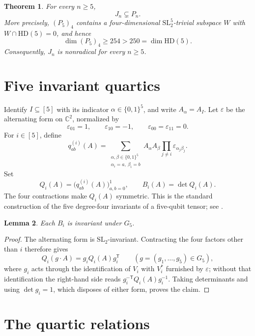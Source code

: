 \documentclass[11pt]{amsart}
\newtheorem{theorem}{Theorem}
\newtheorem{lemma}[theorem]{Lemma}
\theoremstyle{remark}
\newcommand{\C}{\mathbb C}
\newcommand{\HD}{\mathrm{HD}}
\begin{document}
\begin{theorem}\label{thm:main}
For every \(n\geq5\),
\[
  J_n\subsetneq P_n.
\]
More precisely, \((P_5)_4\) contains a four-dimensional
\(\mathrm{SL}_2^5\)-trivial subspace \(W\) with \(W\cap\HD(5)=0\), and hence
\[
  \dim(P_5)_4\geq254>250=\dim\HD(5).
\]
Consequently, \(J_n\) is nonradical for every \(n\geq5\).
\end{theorem}

\section{Five invariant quartics}

Identify \(I\subseteq[5]\) with its indicator
\(\alpha\in\{0,1\}^5\), and write \(A_\alpha=A_I\).
Let \(\varepsilon\) be the alternating form on \(\C^2\), normalized by
\[
  \varepsilon_{01}=1,
  \qquad
  \varepsilon_{10}=-1,
  \qquad
  \varepsilon_{00}=\varepsilon_{11}=0.
\]
For \(i\in[5]\), define
\begin{equation}\label{eq:Qi}
  q^{(i)}_{ab}(A)
  =
  \sum_{\substack{\alpha,\beta\in\{0,1\}^5\\
                   \alpha_i=a,\ \beta_i=b}}
  A_\alpha A_\beta
  \prod_{j\neq i}\varepsilon_{\alpha_j\beta_j}.
\end{equation}
Set
\[
  Q_i(A)=\bigl(q^{(i)}_{ab}(A)\bigr)_{a,b=0}^1,
  \qquad
  B_i(A)=\det Q_i(A).
\]
The four contractions make \(Q_i(A)\) symmetric. This is the standard
construction of the five degree-four invariants of a five-qubit tensor;
see \cite{LT}.

\begin{lemma}\label{lem:invariance}
Each \(B_i\) is invariant under \(G_5\).
\end{lemma}

\begin{proof}
The alternating form is \(\mathrm{SL}_2\)-invariant. Contracting the
four factors other than \(i\) therefore gives
\[
  Q_i(g\cdot A)=g_iQ_i(A)g_i^{\mathsf T}
  \qquad(g=(g_1,\dots,g_5)\in G_5),
\]
where \(g_i\) acts through the identification of \(V_i\) with \(V_i^*\)
furnished by \(\varepsilon\); without that identification the right-hand
side reads \(g_i^{-\mathsf T}Q_i(A)g_i^{-1}\). Taking determinants and
using \(\det g_i=1\), which disposes of either form, proves the claim.
\end{proof}

\section{The quartic relations}\label{sec:relations}
\end{document}
